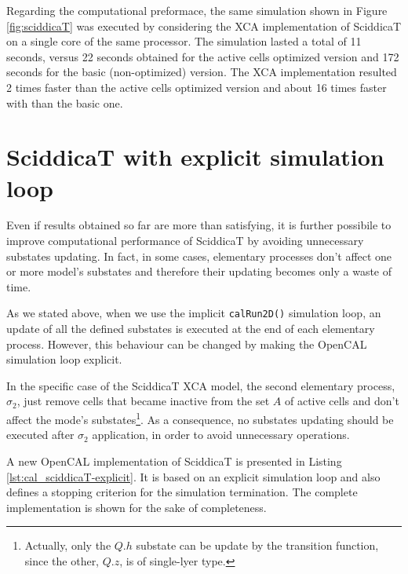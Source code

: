 Regarding the computational preformace, the same simulation shown in
Figure \ref{fig:sciddicaT} was executed by considering the XCA
implementation of SciddicaT on a single core of the same
processor. The simulation lasted a total of 11 seconds, versus 22
seconds obtained for the active cells optimized version and 172
seconds for the basic (non-optimized) version. The XCA implementation resulted 2 times
faster than the active cells optimized version and about 16 times faster with
than the basic one.



\section{SciddicaT with explicit simulation loop}
Even if results obtained so far are more than satisfying, it is
further possibile to improve computational performance of SciddicaT by
avoiding unnecessary substates updating. In fact, in some cases, elementary
processes don't affect one or more model's substates and therefore their
updating becomes only a waste of time.

As we stated above, when we use the implicit \verb'calRun2D()'
simulation loop, an update of all the defined substates is executed at
the end of each elementary process. However, this behaviour can be
changed by making the OpenCAL simulation loop explicit.

In the specific case of the SciddicaT XCA model, the second elementary
process, $\sigma_2$, just remove cells that became inactive from the
set $A$ of active cells and don't affect the mode's
substates\footnote{Actually, only the $Q.h$ substate can be update by
  the transition function, since the other, $Q.z$, is of single-lyer
  type.}. As a consequence, no substates updating should be executed
after $\sigma_2$ application, in order to avoid unnecessary
operations.

A new OpenCAL implementation of SciddicaT is presented in Listing
\ref{lst:cal_sciddicaT-explicit}. It is based on an explicit
simulation loop and also defines a stopping criterion for the
simulation termination. The complete implementation is shown for the
sake of completeness.





